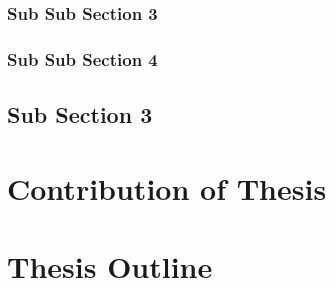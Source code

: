 \subsubsection{Sub Sub Section 3}

\subsubsection{Sub Sub Section 4}

\subsection{Sub Section 3}

\section{Contribution of Thesis}

\section{Thesis Outline}